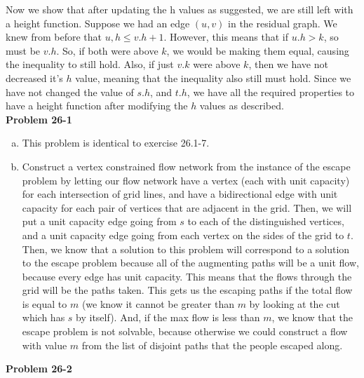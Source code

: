 \documentclass{article}
\begin{document}
Now we show that after updating the h values as suggested, we are still left with a height function. Suppose we had an edge $(u,v)$ in the residual graph. We knew from before that $u,h \le v.h+1$. However, this means that if $u.h>k$, so must be $v.h$. So, if both were above $k$, we would be making them equal, causing the inequality to still hold. Also, if just $v.k$ were above $k$, then we have not decreased it's $h$ value, meaning that the inequality also still must hold. Since we have not changed the value of $s.h$, and $t.h$, we have all the required properties to have a height function after modifying the $h$ values as described.\\


\noindent\textbf{Problem 26-1}\\

\begin{enumerate}[a.]
\item
This problem is identical to exercise 26.1-7.
\item
Construct a vertex constrained flow network from the instance of the escape problem by letting our flow network have a vertex (each with unit capacity) for each intersection of grid lines, and have a bidirectional edge with unit capacity for each pair of vertices that are adjacent in the grid. Then, we will put a unit capacity edge going from $s$ to each of the distinguished vertices, and a unit capacity edge going from each vertex on the sides of the grid to $t$. Then, we know that a solution to this problem will correspond to a solution to the escape problem because all of the augmenting paths will be a unit flow, because every edge has unit capacity. This means that the flows through the grid will be the paths taken. This gets us the escaping paths if the total flow is equal to $m$ (we know it cannot be greater than $m$ by looking at the cut which has $s$ by itself). And, if the max flow is less than $m$, we know that the escape problem is not solvable, because otherwise we could construct a flow with value $m$ from the list of disjoint paths that the people escaped along.
\end{enumerate}

\noindent\textbf{Problem 26-2}\\
\end{document}

